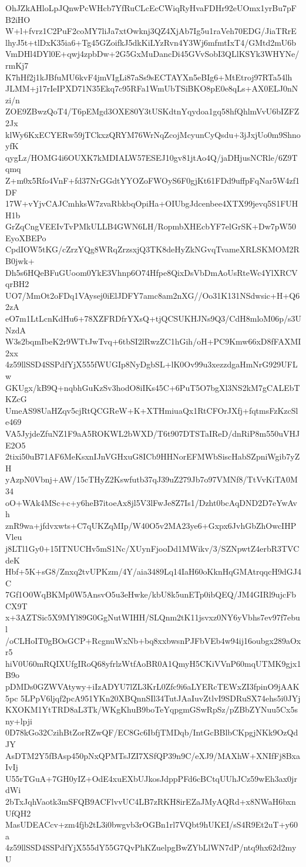 OhJZkAHloLpJQnwPcWHcb7YfRuCLcEcCWiqRyHvaFDHr92eUOmx1yrBu7pFB2iHO
W+l+fvrz1C2PuF2coMY7liJa7xtOwknj3QZ4XjAb7Ig5u1raVeh70EDG/JiaTRrE
lhyJ5t+tlDxK35ia6+Tg45GZoifkJ5dkKiLYzRvn4Y3Wj6mfmtIxT4/GMtd2mU6b
VmDHl4DYl0E+qwj4zpbDw+2G5GxMuDancDi45GVvSobI3QLlKSYk3WHYNe/rmKj7
K7hHf2j1kJBfuMU6kvF4jmVIgLi87aSs9sECTAYXn5eBIg6+MtEtroj97RTa54lh
JLMM+j17rIeIPXD71N35Ekq7c95RFa1WmUbTSiBKO8pE0e8qLs+AX0ELJ0nNzi/n
ZOE9ZBwzQoT4/T6pEMgd3OXE80Y3tUSKdtnYqydoa1gq58hfQhlmVvU6bIZFZ2Jx
klWy6KxECYERw59jTCkxzQRYM76WrNqZcojMcyunCyQsdu+3jJxjUo0m9ShnoyfK
qygLz/HOMG4i6OUXK7kMDIALW57ESEJ10gv81jtAo4Q/jaDHjusNCRle/6Z9Tqmq
Z+m0x5Rfo4VnF+fd37NrGGdtYYOZoFWOyS6F0gjKt61FDd9uffpFqNar5W4zf1DF
17W+vYjvCAJCmhksW7zvaRbkbqOpiHa+OIUbgJdcenbee4XTX99jevq5S1FUHH1b
GrZqCngVEEIvTvPMkULLB4GWN6LH/RopmbXHEcbYF7elGrSK+Dw7pW50EyoXBEPo
CpdIOW5tKG/cZrzYQg8WRqZrzsxjQ3TK8deHyZkNGvqTvameXRLSKMOM2RB0jwk+
Dh5s6HQeBFuGUoom0YkE3Vhnp6O74Hfpe8QixDsVbDmAoUsRteWc4YlXRCVqrBH2
UO7/MmOt2oFDq1VAysej0iElJDFY7amc8am2nXG//Oo31K131NSdwsic+H+Q62zA
eO7m1LtLcnKdHu6+78XZFRDfrYXsQ+tjQCSUKHJNs9Q3/CdH8mloM06p/s3UNzdA
W3s2bqmIbeK2r9WTtJwTvq+6tbSI2lRwzZC1hGih/oH+PC9Kmw66xD8fFAXMI2xx
4z59llSSD4SSPdfYjX555fWUGIp8NyDgbSL+lK0Ov99u3xezzdgaHmNrG929UFLw
GKUgx/kB9Q+nqbhGuKzSv3hodO8iIKs45C+6PuT5O7bgXl3NS2kM7gCALEbTKZcG
UmeAS98UaHZqv5cjRtQCGReW+K+XTHmiuaQx1RtCFOrJXfj+fqtmsFzKzcSle469
VA5JyjdeZfuNZ1F9aA5ROKWL2bWXD/T6t907DTSTaIReD/dnRiP8m550uVHJE2O5
2tixi50uB71AF6MeKsxnIJnVGHxuG8ICb9HHNorEFMWbSiscHabSZpniWgib7yZH
yAzpN0Vbnj+AW/15cTHyZ2Kswfutb37qJ39uZ279Jb7o97VMNf8/TtVvKiTA0M34
oO+WAk4MSc+c+y6heB7itoeAx8jl5V3lFwJe8Z7Is1/Dzht0bcAqDND2D7eYwAvh
znR9wa+jfdvxwts+C7qUKZqMIp/W40O5v2MA23ye6+Gxpx6JvhGbZhOwcIHPVleu
j8LTl1Gy0+15ITNUCHv5mS1Nc/XUynFjooDd1MWikv/3/SZNpwtZ4erbR3TVCdeK
Hbf+5K+sG8/Znxq2tvUPKzm/4Y/aia3489Lq14IaH60oKknHqGMAtrqqcH9dGJ4C
7Gf1O0WqBKMp0W5AnsvO5u3eHwke/kbU8k5unETp0ibQEQ/JM4GIRl9ujcFbCX9T
x+3AZTSic5X9MYl89G0GgNutWIHH/SLQnm2tK11jsvxz0NY6yVbhs7ev97f7ebul
/oCLHoIT0gBOsGCP+RcgnuWxNb+bq8xxbwsnPJFbVEb4w94ij16oubgx289aOxr5
hiV0U60mRQIXUfgIRoQ68yfrlzWtfAoBR0A1QmyH5CKiVVnP60mqUTMK9gjx1B9o
pDMDs0GZWVAtywy+iIzADYU7lZL3KrL0Zfc9i6aLYERcTEWxZI3fpinO9jAAK5pc
5LPpV6ljqf2pcA951YKn20XBQnnSIl34TutJAaIuvZtlvI9SDRuSX74ehs5i0JYj
KXOKM1YtTRD8aL3Tk/WKgKhuB9boTeYqpgmGSwRpSz/pZBbZYNuu5Cx5sny+lpji
0D78kGo32CzihBtZorRZwQF/EC8Gc6IbfjTMDqb/IntGcBBlbCKpgjNKk9OzQdJY
AsDTM2Y5fBAsp450pNxQPMTsJZI7XSfQP39n9C/eXJ9/MAXhW+XNIfFj8BxaIvIj
U55rTGuA+7GH0yIZ+OdE4xuEXbUJkosJdppPFd6cBCtqUUhJCz59wEh3ax0jrdWi
2bTxJqhVaotk3mSFQB9ACFlvvUC4LB7zRKH8irEZaJMyAQRd+x8NWaH6bxnUfQH2
MasUDEACcv+zm4fjb2tL3i0bwgvb3rOGBn1rl7VQbt9hUKEI/sS4R9Et2uT+y60a
4z59llSSD4SSPdfYjX555dY55G7QvPhKZuelpgBwZYbLlWN7dP/ntq9hx62d2myU
